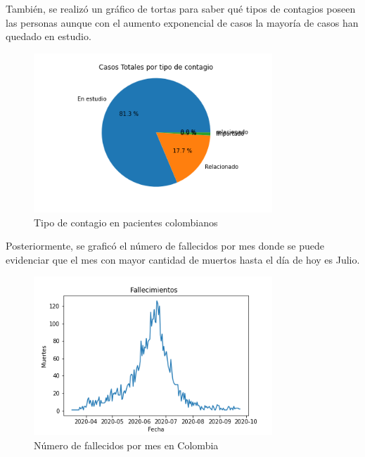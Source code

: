 \documentclass[conference,compsoc,onecolumn]{IEEEtran}
\begin{document}
También, se realizó un gráfico de tortas para saber qué tipos de contagios poseen las personas aunque con el aumento exponencial de casos la mayoría de casos han quedado en estudio.
\begin{figure}[H]
    \centering
    \includegraphics[keepaspectratio,width=0.8\textwidth]{TipoContagio.png}
    \caption{Tipo de contagio en pacientes colombianos}
    \label{fig:TipoContagio}
\end{figure}

Posteriormente, se graficó el número de fallecidos por mes donde se puede evidenciar que el mes con mayor cantidad de muertos hasta el día de hoy es Julio.
\begin{figure}[H]
    \centering
    \includegraphics[keepaspectratio,width=0.8\textwidth]{Fallecimientos.png}
    \caption{Número de fallecidos por mes en Colombia}
    \label{fig:FallecidosMes}
\end{figure}
\end{document}
